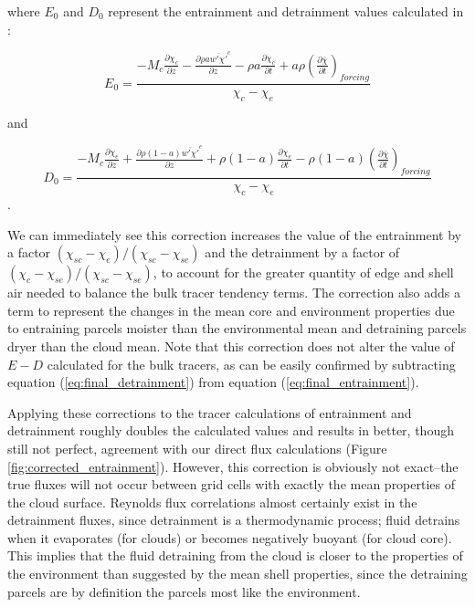 \documentclass[12pt]{article}
\begin{document}
where $E_0$ and $D_0$ represent the entrainment and detrainment values
calculated in \cite{Siebesma1995}:

\begin{equation}
  \label{eq:E_0_equation}
    E_0 = \frac{- M_c \frac{\partial \chi_c}{\partial z}
        - \frac{\partial \rho a \overline{w' \chi'}^c}{\partial z}
        - \rho a \frac{\partial \chi_c}{\partial t}
        + a \rho \left(\frac{\partial \bar{\chi}}{\partial t}\right)_{forcing}}
        {\chi_c - \chi_e}
\end{equation}

and

\begin{equation}
  \label{eq:D_0_equation}
    D_0 = \frac{- M_c \frac{\partial \chi_e}{\partial z}
        + \frac{\partial \rho (1 - a) \overline{w' \chi'}^e}{\partial z}
        + \rho (1 - a) \frac{\partial \chi_e}{\partial t}
        - \rho (1 - a) \left(\frac{\partial \bar{\chi}}{\partial t}\right)_{forcing}}
        {\chi_c - \chi_e}
\end{equation}.

We can immediately see this correction increases the value of the entrainment 
by a factor $(\chi_{sc} - \chi_e)/(\chi_{sc} - \chi_{se})$ and the detrainment 
by a factor of $(\chi_c - \chi_{se})/(\chi_{sc} - \chi_{se})$, to account for 
the greater quantity of edge and shell air needed to balance the bulk tracer 
tendency terms.  The correction also adds a term to represent the changes in 
the mean core and environment properties due to entraining parcels moister than 
the environmental mean and detraining parcels dryer than the cloud mean.  Note 
that this correction does not alter the value of $E-D$ calculated for the bulk 
tracers, as can be easily confirmed by subtracting equation 
(\ref{eq:final_detrainment}) from equation (\ref{eq:final_entrainment}).

Applying these corrections to the tracer calculations of entrainment and 
detrainment roughly doubles the calculated values and results in better, though 
still not perfect, agreement with our direct flux calculations (Figure 
\ref{fig:corrected_entrainment}).  However, this correction is obviously not
exact--the true fluxes will not occur between grid cells with exactly the mean
properties of the cloud surface.  Reynolds flux correlations almost certainly
exist in the detrainment fluxes, since detrainment is a thermodynamic process;
fluid detrains when it evaporates (for clouds) or becomes negatively buoyant
(for cloud core).  This implies that the fluid detraining from the cloud is
closer to the properties of the environment than suggested by the mean shell
properties, since the detraining parcels are by definition the parcels most
like the environment.
\end{document}
